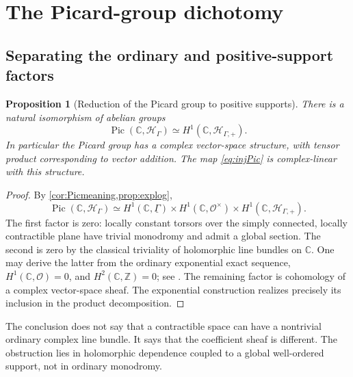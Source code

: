 \documentclass[11pt,letterpaper]{article}
\newtheorem{proposition}[proposition]{Proposition}
\theoremstyle{definition}
\theoremstyle{remark}
\newcommand{\C}{\mathbb C}
\newcommand{\Z}{\mathbb Z}
\newcommand{\OO}{\mathcal O}
\newcommand{\HH}{\mathscr H_\Gamma}
\newcommand{\HP}{\mathscr H_{\Gamma,+}}
\newcommand{\Pic}{\operatorname{Pic}}
\numberwithin{equation}{section}
\begin{document}
\section{The Picard-group dichotomy}\label{sec:Pic}
\subsection{Separating the ordinary and positive-support factors}
\begin{proposition}[Reduction of the Picard group to positive supports]\label{prop:Picreduction}
There is a natural isomorphism of abelian groups
\begin{equation}\label{eq:PicH1}
 \Pic(\C,\HH)\simeq H^1(\C,\HP).
\end{equation}
In particular the Picard group has a complex vector-space structure, with tensor product corresponding to vector addition. The map \eqref{eq:injPic} is complex-linear with this structure.
\end{proposition}
\begin{proof}
By \cref{cor:Picmeaning,prop:explog},
\[
 \Pic(\C,\HH)
 \simeq H^1(\C,\underline\Gamma)
 \times H^1(\C,\OO^\times)
 \times H^1(\C,\HP).
\]
The first factor is zero: locally constant torsors over the simply connected, locally contractible plane have trivial monodromy and admit a global section. The second is zero by the classical triviality of holomorphic line bundles on $\C$. One may derive the latter from the ordinary exponential exact sequence, $H^1(\C,\OO)=0$, and $H^2(\C,\Z)=0$; see \cite{Demailly}. The remaining factor is cohomology of a complex vector-space sheaf. The exponential construction realizes precisely its inclusion in the product decomposition.
\end{proof}
The conclusion does not say that a contractible space can have a nontrivial ordinary complex line bundle. It says that the coefficient sheaf is different. The obstruction lies in holomorphic dependence coupled to a global well-ordered support, not in ordinary monodromy.
\end{document}
